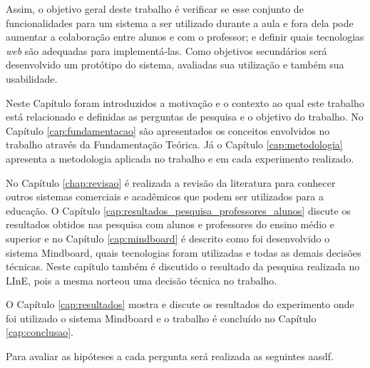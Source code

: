 Assim, o objetivo geral deste trabalho é verificar se esse conjunto de funcionalidades para um sistema a ser utilizado durante a aula e fora dela pode aumentar a colaboração entre alunos e com o professor; e definir quais tecnologias \emph{web} são adequadas para implementá-las. Como objetivos secundários será desenvolvido um protótipo do sistema, avaliadas sua utilização e também sua usabilidade.


Neste Capítulo foram introduzidos a motivação e o contexto ao qual este trabalho está relacionado e definidas as perguntas de pesquisa e o objetivo do trabalho. No Capítulo \ref{cap:fundamentacao} são apresentados os conceitos envolvidos no trabalho através da Fundamentação Teórica. Já o Capítulo \ref{cap:metodologia} apresenta a metodologia aplicada no trabalho e em cada experimento realizado. 

No Capítulo \ref{chap:revisao} é realizada a revisão da literatura para conhecer outros sistemas comerciais e acadêmicos que podem ser utilizados para a educação. O Capítulo \ref{cap:resultados_pesquisa_professores_alunos} discute os resultados obtidos nas pesquisa com alunos e professores do ensino médio e superior e no Capítulo \ref{cap:mindboard} é descrito como foi desenvolvido o sistema Mindboard, quais tecnologias foram utilizadas e todas as demais decisões técnicas. Neste capítulo também é discutido o resultado da pesquisa realizada no LInE, pois a mesma norteou uma decisão técnica no trabalho.

O Capítulo \ref{cap:resultados} mostra e discute os resultados do experimento onde foi utilizado o sistema Mindboard e o trabalho é concluído no Capítulo \ref{cap:conclusao}.

\iffalse

Para avaliar as hipóteses a cada pergunta será realizada as seguintes aasdf.




